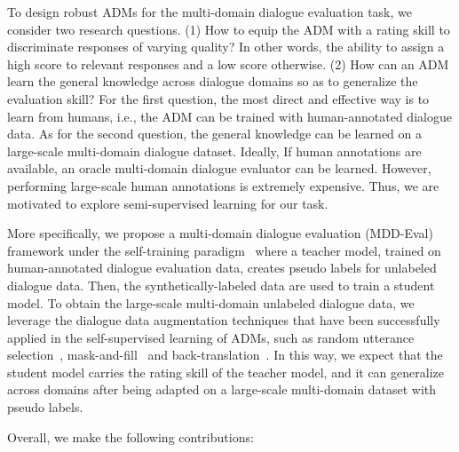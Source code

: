 \documentclass[letterpaper]{article} \usepackage{aaai22}  \usepackage{times}  \usepackage{helvet}  \usepackage{courier}  \usepackage[hyphens]{url}  \usepackage{graphicx} \urlstyle{rm} \def\UrlFont{\rm}  \usepackage{natbib}  \usepackage{caption} \DeclareCaptionStyle{ruled}{labelfont=normalfont,labelsep=colon,strut=off} \frenchspacing  \setlength{\pdfpagewidth}{8.5in}  \setlength{\pdfpageheight}{11in}  \usepackage{algorithm}
\begin{document}
To design robust ADMs for the multi-domain dialogue evaluation task, we consider two research questions. (1) How to equip the ADM with a rating skill to discriminate responses of varying quality? In other words, the ability to assign a high score to relevant responses and a low score otherwise. (2) How can an ADM learn the general knowledge across dialogue domains so as to generalize the evaluation skill? For the first question, the most direct and effective way is to learn from humans, i.e., the ADM can be trained with human-annotated dialogue data. As for the second question, the general knowledge can be learned on a large-scale multi-domain dialogue dataset. Ideally, If human annotations are available, an oracle multi-domain dialogue evaluator can be learned. However, performing large-scale human annotations is extremely expensive. Thus, we are motivated to explore semi-supervised learning for our task. 







More specifically, we propose a multi-domain dialogue evaluation (MDD-Eval) framework under the self-training paradigm~\citep{scudder1965probability,yarowsky1995unsupervised} where a teacher model, trained on human-annotated dialogue evaluation data, creates pseudo labels for unlabeled dialogue data. Then, the synthetically-labeled data are used to train a student model. To obtain the large-scale multi-domain unlabeled dialogue data, we leverage the dialogue data augmentation techniques that have been successfully applied in the self-supervised learning of ADMs, such as random utterance selection~\citep{tao2018ruber,zhang-etal-2021-dscore}, mask-and-fill~\citep{donahue-etal-2020-enabling,gupta-etal-2021-synthesizing} and back-translation~\citep{edunov-etal-2018-understanding,sinha-etal-2020-learning}. In this way, we expect that the student model carries the rating skill of the teacher model, and it can generalize across domains after being adapted on a large-scale multi-domain dataset with pseudo labels.



\bigskip
\noindent Overall, we make the following contributions:
                                     
\end{document}
